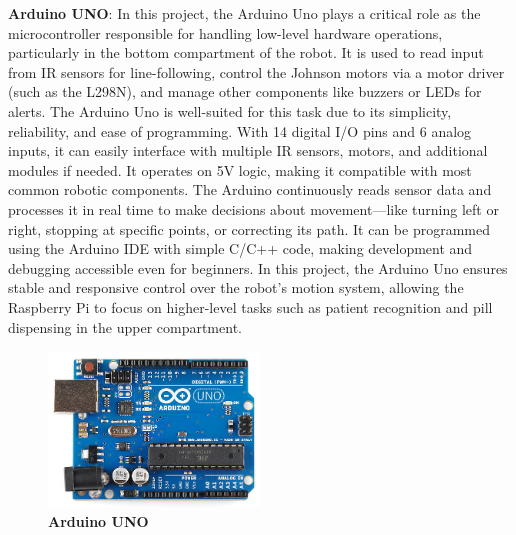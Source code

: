 \textbf{Arduino UNO}: In this project, the Arduino Uno plays a critical role as the microcontroller responsible for handling low-level hardware operations, particularly in the bottom compartment of the robot. It is used to read input from IR sensors for line-following, control the Johnson motors via a motor driver (such as the L298N), and manage other components like buzzers or LEDs for alerts. The Arduino Uno is well-suited for this task due to its simplicity, reliability, and ease of programming. With 14 digital I/O pins and 6 analog inputs, it can easily interface with multiple IR sensors, motors, and additional modules if needed. It operates on 5V logic, making it compatible with most common robotic components. The Arduino continuously reads sensor data and processes it in real time to make decisions about movement—like turning left or right, stopping at specific points, or correcting its path. It can be programmed using the Arduino IDE with simple C/C++ code, making development and debugging accessible even for beginners. In this project, the Arduino Uno ensures stable and responsive control over the robot’s motion system, allowing the Raspberry Pi to focus on higher-level tasks such as patient recognition and pill dispensing in the upper compartment.

\begin{figure}[htbp!]
\centering
\includegraphics[width=0.5\textwidth,height=0.3\textwidth]{images/fig3.3.png}
\caption{\textbf{Arduino UNO}}
\label{fig:3.3}
\end{figure}

\vspace{1.5\baselineskip} %

